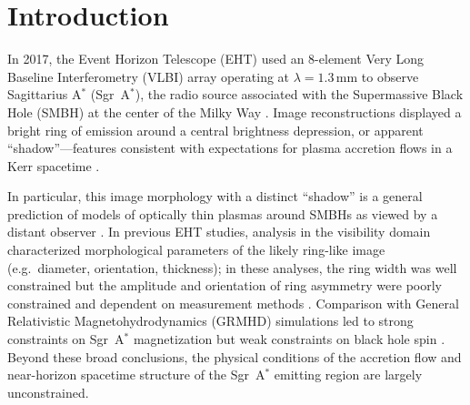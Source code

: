 \documentclass[linenumbers, twocolumn, tighten]{aastex701}
\def\sgra{Sgr~A$^*$\xspace}
\begin{document}


\section{Introduction} \label{sec: introduction}
In 2017, the Event Horizon Telescope (EHT) used an 8-element Very Long Baseline Interferometry (VLBI) array operating at $\lambda = 1.3$\,mm to observe Sagittarius A$^*$ (\sgra), the radio source associated with the Supermassive Black Hole (SMBH) at the center of the Milky Way \citep{1974ApJ...194..265B}. Image reconstructions displayed a bright ring of emission around a central brightness depression, or apparent ``shadow''---features consistent with expectations for plasma accretion flows in a Kerr spacetime \citep[][hereafter Sgr~A* I-VIII]{EHT2022-I, EHT2022-II, EHT2022-III, EHT2022-IV, EHT2022-V, EHT2022-VI, EHT2024-VII, EHT2024-VIII}. 


In particular, this image morphology with a distinct ``shadow'' is a general prediction of models of optically thin plasmas around SMBHs as viewed by a distant observer 
\citep[e.g.][]{1973blho.conf..215B, 1979A&A....75..228L, 2000CQGra..17..123D, 2000ApJ...528L..13F, Broderick_2016, 2019ApJ...885L..33N}.
In previous EHT studies, analysis in the visibility domain characterized morphological parameters of the likely ring-like image (e.g.\ diameter, orientation, thickness); in these analyses, the ring width was well constrained but the amplitude and orientation of ring asymmetry were poorly constrained and dependent on measurement methods . Comparison with General Relativistic Magnetohydrodynamics (GRMHD) simulations led to strong constraints on \sgra magnetization but weak constraints on black hole spin . Beyond these broad conclusions, the physical conditions of the accretion flow and near-horizon spacetime structure of the \sgra emitting region are largely unconstrained.
 
\end{document}
